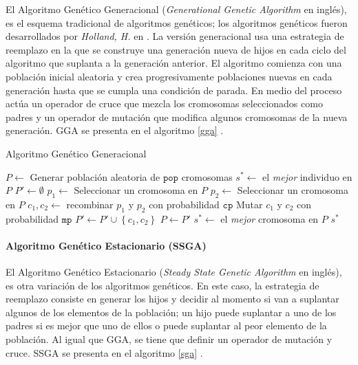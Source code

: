 El Algoritmo Genético Generacional (\emph{Generational Genetic Algorithm} en inglés), es el esquema tradicional de algoritmos genéticos; los algoritmos genéticos fueron desarrollados por \emph{Holland, H.} en \cite{holland1975adaptation}. La versión generacional usa una estrategia de reemplazo en la que se construye una generación nueva de hijos en cada ciclo del algoritmo que suplanta a la generación anterior. El algoritmo comienza con una población inicial aleatoria y crea progresivamente poblaciones nuevas en cada generación hasta que se cumpla una condición de parada. En medio del proceso actúa un operador de cruce que mezcla los cromosomas seleccionados como padres y un operador de mutación que modifica algunos cromosomas de la nueva generación. GGA se presenta en el algoritmo \ref{gga} \cite{flores2014metaheuristics}.

\begin{algorithm}
\caption{Algoritmo Genético Generacional}
\label{gga}
\begin{algorithmic}[1]


\State $P \gets$ Generar población aleatoria de $\texttt{pop}$ cromosomas
\State $s^* \gets $ el \emph{mejor} individuo en $P$
	\State $P' \gets \emptyset$
		\State $p_1 \gets$ Seleccionar un cromosoma en $P$
		\State $p_2 \gets$ Seleccionar un cromosoma en $P$
		\State $c_1, c_2 \gets $ recombinar $p_1$ y $p_2$ con probabilidad $\texttt{cp}$
		\State Mutar $c_1$ y $c_2$ con probabilidad $\texttt{mp}$
		\State $P' \gets P' \cup \left\lbrace c_1, c_2 \right\rbrace$
	\EndWhile
	\State $P \gets P'$
		\State $s^* \gets$ el \emph{mejor} cromosoma en $P$
	\EndIf
\EndWhile
\State \Return $s^*$

\end{algorithmic}
\end{algorithm}

\paragraph{Algoritmo Genético Estacionario (SSGA)}

El Algoritmo Genético Estacionario (\emph{Steady State Genetic Algorithm} en inglés), es otra variación de los algoritmos genéticos. En este caso, la estrategia de reemplazo consiste en generar los hijos y decidir al momento si van a suplantar algunos de los elementos de la población; un hijo puede suplantar a uno de los padres si es mejor que uno de ellos o puede suplantar al peor elemento de la población. Al igual que GGA, se tiene que definir un operador de mutación y cruce. SSGA se presenta en el algoritmo \ref{sga} \cite{flores2014metaheuristics}.

